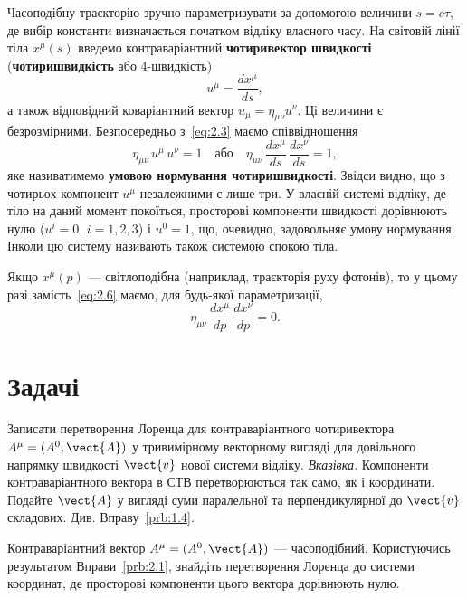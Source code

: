 Часоподібну траєкторію зручно параметризувати за допомогою величини $s = c\tau$,
де вибір константи визначається початком відліку власного часу. На світовій
лінії тіла $x^\mu(s)$ введемо контраваріантний \textbf{чотиривектор швидкості}
(\textbf{чотиришвидкість} або 4-швидкість)
\[
  u^\mu = \frac{dx^\mu}{ds},
\]
а також відповідний коваріантний вектор $u_\mu = \eta_{\mu\nu}u^\nu$.
Ці величини є безрозмірними. Безпосередньо з~\eqref{eq:2.3} маємо
співвідношення
\begin{equation}
  \eta_{\mu\nu}\,u^\mu\, u^\nu = 1
  \quad\text{або}\quad
  \eta_{\mu\nu}\,\frac{dx^\mu}{ds}\,\frac{dx^\nu}{ds} = 1,
  \label{eq:2.6}
\end{equation}
яке називатимемо \textbf{умовою нормування чотиришвидкості}. Звідси видно,
що з чотирьох компонент $u^\mu$ незалежними є лише три. У власній системі
відліку, де тіло на даний момент покоїться, просторові компоненти
швидкості дорівнюють нулю ($u^i = 0$, $i=1,2,3$) і $u^0 = 1$, що,
очевидно, задовольняє умову нормування. Інколи цю систему називають також
системою спокою тіла.

Якщо $x^\mu(p)$ --- світлоподібна (наприклад, траєкторія руху фотонів),
то у цьому разі замість~\eqref{eq:2.6} маємо, для будь-якої параметризації,
\[
  \eta_{\mu\nu}\,\frac{dx^\mu}{dp}\,\frac{dx^\nu}{dp} = 0.
\]

\section*{Задачі}


\begin{problem}\label{prb:2.1}%
    Записати перетворення Лоренца для контраваріантного
    чотиривектора $A^\mu = (A^0, \vect{A})$ у тривимірному векторному вигляді для довільного
    напрямку швидкості $\vect{v}$ нової системи відліку.
    \textit{Вказівка.} Компоненти контраваріантного вектора в СТВ
    перетворюються так само, як і координати. Подайте $\vect{A}$ у вигляді
    суми паралельної та перпендикулярної до $\vect{v}$ складових. Див.
    Вправу~\ref{prb:1.4}.
\end{problem}

\begin{problem}%
Контраваріантний вектор $A^\mu = (A^0, \vect{A})$ --- часоподібний.
Користуючись результатом Вправи~\ref{prb:2.1}, знайдіть перетворення Лоренца до
системи координат, де просторові компоненти цього вектора дорівнюють нулю.
\end{problem}

